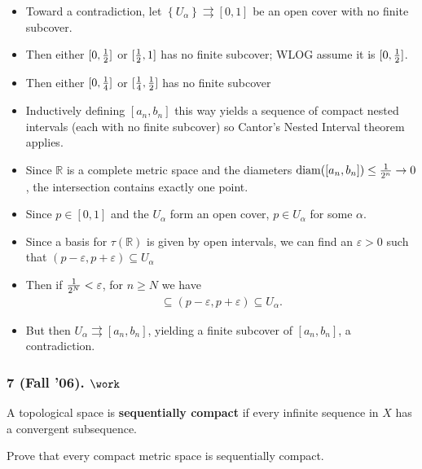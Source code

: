 \begin{solution}

\envlist

\begin{itemize}
\tightlist
\item
  Toward a contradiction, let
  \(\left\{{U_\alpha}\right\} \rightrightarrows[0, 1]\) be an open cover
  with no finite subcover.
\item
  Then either \([0, {1\over 2}]\) or \([{1\over 2}, 1]\) has no finite
  subcover; WLOG assume it is \([0, {1\over 2}]\).
\item
  Then either \([0, {1\over 4}]\) or \([{1\over 4}, {1\over 2}]\) has no
  finite subcover
\item
  Inductively defining \([a_n, b_n]\) this way yields a sequence of
  compact nested intervals (each with no finite subcover) so Cantor's
  Nested Interval theorem applies.
\item
  Since \({\mathbb{R}}\) is a complete metric space and the diameters
  \({\operatorname{diam}}([a_n, b_n]) \leq {1 \over 2^n} \to 0\), the
  intersection contains exactly one point.
\item
  Since \(p\in [0, 1]\) and the \(U_\alpha\) form an open cover,
  \(p\in U_\alpha\) for some \(\alpha\).
\item
  Since a basis for \(\tau({\mathbb{R}})\) is given by open intervals,
  we can find an \(\varepsilon>0\) such that
  \((p-\varepsilon, p+\varepsilon) \subseteq U_\alpha\)
\item
  Then if \({1\over 2^N} < \varepsilon\), for \(n\geq N\) we have
  \begin{align*}[a_n, b_n] \subseteq (p-\varepsilon, p+\varepsilon) \subseteq U_\alpha.\end{align*}
\item
  But then \(U_\alpha \rightrightarrows[a_n, b_n]\), yielding a finite
  subcover of \([a_n, b_n]\), a contradiction.
\end{itemize}

\end{solution}

\hypertarget{fall-06.-work}{%
\subsubsection{\texorpdfstring{7 (Fall '06).
\(\work\)}{7 (Fall '06). \textbackslash work}}\label{fall-06.-work}}

\begin{problem}[Fall 2006, 7]

A topological space is \textbf{sequentially compact} if every infinite
sequence in \(X\) has a convergent subsequence.

Prove that every compact metric space is sequentially compact.

\end{problem}

